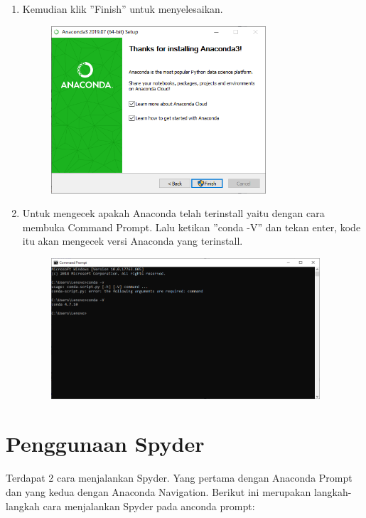 \begin{enumerate}
	\item Kemudian klik ''Finish'' untuk menyelesaikan.
	\begin{figure}[!htbp]
		\includegraphics[width=8cm]{figures/ana8.PNG}
		\centering
	\end{figure}
\newpage
	\item Untuk mengecek apakah Anaconda telah terinstall yaitu dengan cara membuka Command Prompt. Lalu ketikan ''conda -V'' dan tekan enter, kode itu akan mengecek versi Anaconda yang terinstall.
	\begin{figure}[!htbp]
		\includegraphics[width=10cm]{figures/akhirconda.PNG}
		\centering
	\end{figure}

\end{enumerate}

\section{Penggunaan Spyder}

Terdapat 2 cara menjalankan Spyder. Yang pertama dengan Anaconda Prompt dan yang kedua dengan Anaconda Navigation. Berikut ini merupakan langkah-langkah cara menjalankan Spyder pada anconda prompt:

